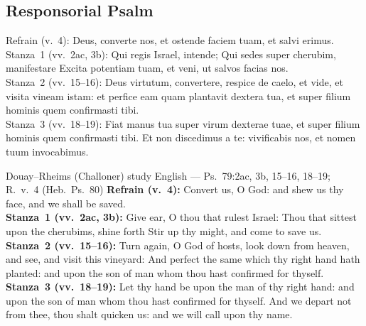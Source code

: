 \subsection{Responsorial Psalm}\label{proper-responsorial-psalm}
\begin{latinproper}
\textnormal{Refrain (v.~4):} Deus, converte nos, et ostende faciem tuam, et salvi erimus.\\
\textnormal{Stanza~1 (vv.~2ac, 3b):} Qui regis Israel, intende;  Qui sedes super cherubim, manifestare  Excita potentiam tuam, et veni, ut salvos facias nos.\\
\textnormal{Stanza~2 (vv.~15--16):} Deus virtutum, convertere, respice de caelo, et vide, et visita vineam istam: et perfice eam quam plantavit dextera tua, et super filium hominis quem confirmasti tibi.\\
\textnormal{Stanza~3 (vv.~18--19):} Fiat manus tua super virum dexterae tuae, et super filium hominis quem confirmasti tibi. Et non discedimus a te: vivificabis nos, et nomen tuum invocabimus.
\end{latinproper}
\begin{englishwitness}{Douay--Rheims (Challoner) study English --- Ps.~79:2ac, 3b, 15--16, 18--19; R.~v.~4 (Heb.~Ps.~80)}
\textbf{Refrain (v.~4):} Convert us, O God: and shew us thy face, and we shall be saved.\\
\textbf{Stanza~1 (vv.~2ac, 3b):} Give ear, O thou that rulest Israel:  Thou that sittest upon the cherubims, shine forth  Stir up thy might, and come to save us.\\
\textbf{Stanza~2 (vv.~15--16):} Turn again, O God of hosts, look down from heaven, and see, and visit this vineyard: And perfect the same which thy right hand hath planted: and upon the son of man whom thou hast confirmed for thyself.\\
\textbf{Stanza~3 (vv.~18--19):} Let thy hand be upon the man of thy right hand: and upon the son of man whom thou hast confirmed for thyself. And we depart not from thee, thou shalt quicken us: and we will call upon thy name.
\end{englishwitness}

